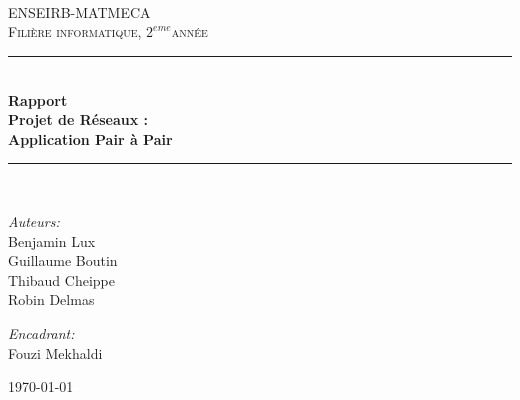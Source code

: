 \documentclass[a4paper
,oneside,11pt]{article}
\def\titre{Rapport\\Projet de Réseaux :\\Application Pair à Pair}
\def\filiere{informatique}
\def\annee{$2^{eme}$}
\def\equipe{Benjamin Lux \\ Guillaume Boutin \\ Thibaud Cheippe \\ Robin Delmas}
\def\encadrant{Fouzi Mekhaldi}
\newcommand{\HRule}{\rule{\linewidth}{0.5mm}}
\begin{document}
\begin{titlepage}

\begin{center}


\begin{center}
\end{center}
~\\
~\\
~\\
\textsc{\LARGE ENSEIRB-MATMECA}\\[1cm]

\textsc{\Large {Fili\`ere \filiere, \annee ann\'ee}}\\[0.5cm]

\HRule \\[0.4cm]
{ \huge \bfseries \titre}\\[0.4cm]


\HRule \\[1.5cm]


\begin{minipage}{0.4\textwidth}
\begin{flushleft} \large
\emph{Auteurs:}\\
\equipe
\end{flushleft}
\end{minipage}
\begin{minipage}{0.4\textwidth}
\begin{flushright} \large
\emph{Encadrant:} \\
\encadrant
\end{flushright}
\end{minipage}


\vfill

{\large \today}

\end{center}

\end{titlepage}
\tableofcontents\thispagestyle{fancy}
\newpage
\end{document}
